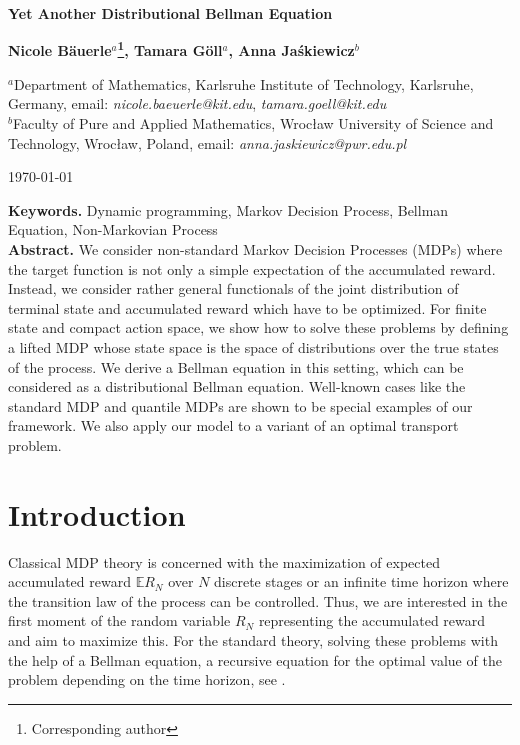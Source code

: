 \documentclass[reqno, 12pt]{amsart}%
\newcommand{\EE}{\mathbb{E}}
\theoremstyle{definition}
\numberwithin{equation}{section} \numberwithin{theorem}{section}
\begin{document}
\renewcommand*{\arraystretch}{1.5}

\begin{center}
{\Large\bf Yet Another Distributional Bellman Equation}
\end{center}

\begin{center}
{\bf \large  Nicole B\"auerle$^{a}$\footnote{Corresponding author}, Tamara G\"oll$^{a}$, Anna Ja\'skiewicz$^{b}$ }
\end{center}
\vspace*{0.5cm}
\noindent$^{a}$Department of Mathematics, Karlsruhe Institute of Technology, 
Karlsruhe, Germany,
{\footnotesize  email: {\it nicole.baeuerle@kit.edu}, {\it tamara.goell@kit.edu}}\\

\noindent$^{b}$Faculty of Pure and Applied Mathematics, Wroc{\l}aw University of Science and Technology,  Wroc\l aw, Poland,
{\footnotesize  email: {\it anna.jaskiewicz@pwr.edu.pl}}\\


\begin{center}
 \today
\end{center}




  \noindent
{\bf Keywords.} Dynamic programming,     Markov Decision Process, Bellman Equation, Non-Markovian Process                   %
    \\


\noindent
{\bf Abstract. }We consider non-standard Markov Decision Processes (MDPs) where the target function is not only a simple expectation of the accumulated reward. Instead, we consider rather general functionals of the joint distribution of terminal state and accumulated reward which have to be optimized. For finite state and compact action space, we show how to solve these problems by defining a lifted MDP whose state space is the space of distributions over the true states of the process. We derive a Bellman equation in this setting, which can be considered as a distributional Bellman equation. Well-known cases like the standard MDP and quantile MDPs are shown to be special examples of our framework. We also apply our model to a variant of an optimal transport problem. 

\section{Introduction}
Classical MDP theory is concerned with the maximization of expected accumulated reward $\EE R_N$ over $N$ discrete stages or an infinite time horizon where the transition law of the process can be controlled. Thus, we are interested in the first moment of the random variable $R_N$ representing the accumulated reward and aim to maximize this. For the standard theory, solving these problems with the help of a Bellman equation, a recursive equation for the optimal value of the problem depending on the time horizon, see \cite{puterman2014markov,lerma96,br11}. 
\end{document}

